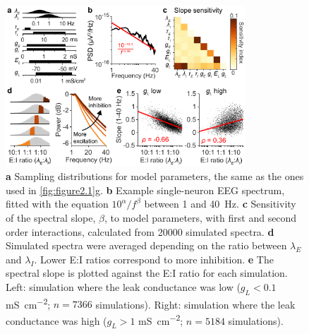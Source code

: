 \begin{figure}
\vspace{-12pt}
\includegraphics[width=90mm]{Figures/chapter2/figure6.pdf}
\vspace{-22pt}
    \caption{
	\textbf{a} Sampling distributions for model parameters, the same as the ones used in \autoref{fig:figure2.1}g.
	\textbf{b} Example single-neuron EEG spectrum, fitted with the equation ${10}^\alpha/f^\beta$ between 1 and \qty{40}{\hertz}.
	\textbf{c} Sensitivity of the spectral slope, $\beta$, to model parameters, with first and second order interactions, calculated from 20000 simulated spectra.
	\textbf{d} Simulated spectra were averaged depending on the ratio between $\lambda_E$ and $\lambda_I$. Lower E:I ratios correspond to more inhibition.
	\textbf{e} The spectral slope is plotted against the E:I ratio for each simulation. Left: simulation where the leak conductance was low ($g_L<0.1$ \unit{\milli\siemens\per\centi\meter\squared}; $n=7366$ simulations). Right: simulation where the leak conductance was high ($g_L>1$ \unit{\milli\siemens\per\centi\meter\squared}; $n=5184$ simulations).
    } \label{fig:figure2.6}
\end{figure}


